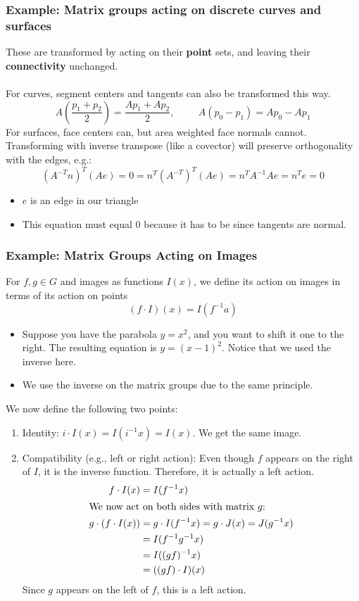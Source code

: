 \documentclass[10pt]{article}
\begin{document}
\subsubsection*{Example: Matrix groups acting on discrete curves and surfaces}
These are transformed by acting on their \textbf{point} sets, and leaving their \textbf{connectivity} unchanged.\\\\
For curves, segment centers and tangents can also be transformed this way.
\[A \left(\frac{p_1 + p_2}{2}\right) = \frac{Ap_1 + Ap_2}{2}, \hspace{1cm} A(p_0 - p_1) = Ap_0 - Ap_1\]
For surfaces, face centers can, but area weighted face normals cannot.  Transforming with inverse transpose (like a covector) will preserve orthogonality with the edges, e.g.:
\[(A^{-T} n)^T(Ae) = 0 = n^T (A^{-T})^T (Ae) = n^T A^{-1} Ae = n^T e = 0\]
\begin{itemize}
    \item $e$ is an edge in our triangle
    \item This equation must equal 0 because it has to be since tangents are normal.
\end{itemize}

\subsubsection*{Example: Matrix Groups Acting on Images}
For $f, g \in G$ and images as functions $I(x)$, we define its action on images in terms of its action on points
\[(f \cdot I)(x) = I(f^{-1}a)\]
\begin{itemize}
    \item Suppose you have the parabola $y = x^2$, and you want to shift it one to the right.  The resulting equation is $y = (x - 1)^2$.  Notice that we used the inverse here.
    \item We use the inverse on the matrix groups due to the same principle.
\end{itemize}
We now define the following two points:
\begin{enumerate}
    \item Identity: $i \cdot I(x) = I(i^{-1} x) = I(x)$.  We get the same image.
    \item Compatibility (e.g., left or right action):  Even though $f$ appears on the right of $I$, it is the inverse function.  Therefore, it is actually a left action.
    \begin{align*}
        f \cdot I(x) &= I(f^{-1} x)\\
        \intertext{We now act on both sides with matrix $g$:}
        g \cdot (f \cdot I(x)) &= g \cdot I(f^{-1} x) = g \cdot J(x) = J(g^{-1} x)\\
        &= I (f^{-1} g^{-1} x) \\
        &= I ((gf)^{-1} x)\\
        &= ((gf) \cdot I)(x)
    \end{align*}
    Since $g$ appears on the left of $f$, this is a left action.
\end{enumerate}
\end{document}
